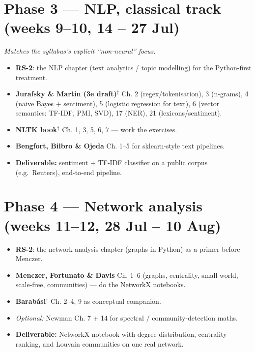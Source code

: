 \documentclass[11pt,a4paper]{article}
\begin{document}
\section{Phase 3 --- NLP, classical track (weeks 9--10, 14 -- 27 Jul)}
\textit{Matches the syllabus's explicit ``non-neural'' focus.}
\begin{itemize}
  \item \textbf{RS-2}: the NLP chapter (text analytics / topic modelling) for the Python-first treatment.
  \item \textbf{Jurafsky \& Martin (3e draft)}$^\dagger$ Ch. 2 (regex/tokenisation), 3 (n-grams), 4 (naive Bayes + sentiment), 5 (logistic regression for text), 6 (vector semantics: TF-IDF, PMI, SVD), 17 (NER), 21 (lexicons/sentiment).
  \item \textbf{NLTK book}$^\dagger$ Ch. 1, 3, 5, 6, 7 --- work the exercises.
  \item \textbf{Bengfort, Bilbro \& Ojeda} Ch. 1--5 for sklearn-style text pipelines.
  \item \textbf{Deliverable:} sentiment + TF-IDF classifier on a public corpus (e.g.\ Reuters), end-to-end pipeline.
\end{itemize}

\section{Phase 4 --- Network analysis (weeks 11--12, 28 Jul -- 10 Aug)}
\begin{itemize}
  \item \textbf{RS-2}: the network-analysis chapter (graphs in Python) as a primer before Menczer.
  \item \textbf{Menczer, Fortunato \& Davis} Ch. 1--6 (graphs, centrality, small-world, scale-free, communities) --- do the NetworkX notebooks.
  \item \textbf{Barab\'asi}$^\dagger$ Ch. 2--4, 9 as conceptual companion.
  \item \textit{Optional:} Newman Ch. 7 + 14 for spectral / community-detection maths.
  \item \textbf{Deliverable:} NetworkX notebook with degree distribution, centrality ranking, and Louvain communities on one real network.
\end{itemize}
\end{document}
